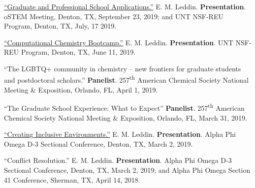 \documentclass[letterpaper,11pt]{article}
\begin{document}
\begin{etaremune}
{\item \textnormal{\href{https://www.youtube.com/watch?v=6VkSUhsZr40&feature=youtu.be}{``Graduate and Professional School Applications.''} E. M. Leddin. \textbf{Presentation}. oSTEM Meeting, Denton, TX, September 23, 2019; and UNT NSF-REU Program, Denton, TX, July, 17 2019.}
  \item \textnormal{\href{http://bit.ly/2019-UNTREU-CCBC}{``Computational Chemistry Bootcamp.''} E. M. Leddin. \textbf{Presentation}. UNT NSF-REU Program, Denton, TX, June 11, 2019.}
  \item \textnormal{``The LGBTQ+ community in chemistry -- new frontiers for graduate students and postdoctoral scholars.'' \textbf{Panelist}. 257\textsuperscript{th} American Chemical Society National Meeting \& Exposition, Orlando, FL, April 1, 2019.}
  \item \textnormal{``The Graduate School Experience: What to Expect'' \textbf{Panelist}. 257\textsuperscript{th} American Chemical Society National Meeting \& Exposition, Orlando, FL, March 31, 2019.}
  \item \textnormal{ \href{https://docs.google.com/presentation/d/1mKDUxe-elMQ7EkTBglIQBeZlcsdBwmfP5loLxAsshF0/edit}{``Creating Inclusive Environments.''} E. M. Leddin. \textbf{Presentation}. Alpha Phi Omega D-3 Sectional Conference, Denton, TX, March 2, 2019.}
  \item \textnormal{``Conflict Resolution.'' E. M. Leddin. \textbf{Presentation}. Alpha Phi Omega D-3 Sectional Conference, Denton, TX, March 2, 2019; and Alpha Phi Omega Section 41 Conference, Sherman, TX, April 14, 2018.}
  }
\end{etaremune}


\end{document}

